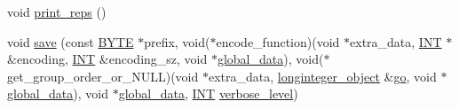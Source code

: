 \begin{DoxyCompactItemize}
\item 
void \mbox{\hyperlink{classclassify__bitvectors_ab67b507ccf01ebf9e9a559c0cadc1691}{print\+\_\+reps}} ()
\item 
void \mbox{\hyperlink{classclassify__bitvectors_a88b83bfd067704c5213d63797a836c5b}{save}} (const \mbox{\hyperlink{galois_8h_ab6cc7b4aeb6ea31aba2b3fbfc83ff5e6}{B\+Y\+TE}} $\ast$prefix, void($\ast$encode\+\_\+function)(void $\ast$extra\+\_\+data, \mbox{\hyperlink{galois_8h_a09fddde158a3a20bd2dcadb609de11dc}{I\+NT}} $\ast$\&encoding, \mbox{\hyperlink{galois_8h_a09fddde158a3a20bd2dcadb609de11dc}{I\+NT}} \&encoding\+\_\+sz, void $\ast$\mbox{\hyperlink{classglobal__data}{global\+\_\+data}}), void($\ast$get\+\_\+group\+\_\+order\+\_\+or\+\_\+\+N\+U\+LL)(void $\ast$extra\+\_\+data, \mbox{\hyperlink{classlonginteger__object}{longinteger\+\_\+object}} \&\mbox{\hyperlink{simeon_8_c_a1516b736c8ebbfb03a9dd7d8826cd9a6}{go}}, void $\ast$\mbox{\hyperlink{classglobal__data}{global\+\_\+data}}), void $\ast$\mbox{\hyperlink{classglobal__data}{global\+\_\+data}}, \mbox{\hyperlink{galois_8h_a09fddde158a3a20bd2dcadb609de11dc}{I\+NT}} \mbox{\hyperlink{simeon_8_c_a818073fbcc2f439e7c56952f67386122}{verbose\+\_\+level}})
\end{DoxyCompactItemize}
